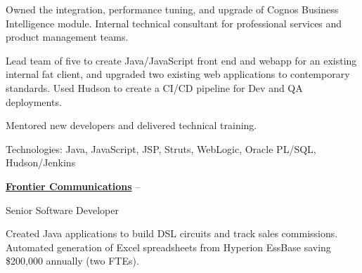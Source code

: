 \documentclass[letterpaper,MMMMyyyy,nonstopmode]{simpleresumecv}
\newcommand{\comment}[1]{\ignorespaces} %
\newif\ifLOCATION
\newif\ifLONG
\begin{document}
\begin{Body}
\begin{Detail}
\BulletItem
Owned the integration, performance tuning, and upgrade of Cognos Business Intelligence module.
\BulletItem
Internal technical consultant for professional services and product management teams.

\end{Detail}

\ifLONG

\BigGap
\Entry
\href{http://www.paychex.com/}
{\textbf{Paychex}}
\hfill 
\DatestampY{2005} -- \DatestampY{2010}

Lead Developer
\ifLOCATION
\hfill
Rochester, New York
\fi

\begin{Detail}
\BulletItem
Lead team of five to create Java/JavaScript front end and webapp for an existing internal fat client, and upgraded two existing web applications to contemporary standards. Used Hudson to create a CI/CD pipeline for Dev and QA deployments.

\BulletItem
Mentored new developers and delivered technical training.
\iffalse
\BulletItem
Member of architecture team to research and set five-year strategy for web application strategy.
\fi

\Gap
Technologies: Java, JavaScript, JSP, Struts, WebLogic, Oracle PL/SQL, Hudson/Jenkins 
\end{Detail}

\BigGap
\Entry
\href{http://www.frontier.com/}
{\textbf{Frontier Communications}}
\hfill 
 -- 

Senior Software Developer
\ifLOCATION
\hfill
Rochester, New York
\fi

\begin{Detail}
\Item
Created Java applications to build DSL circuits and track sales commissions\comment{; CruiseControl used for Continuous Integration}. 
Automated generation of \comment{20} Excel spreadsheets from Hyperion EssBase saving \$200,000 annually (two FTEs).

\end{Detail}


\end{Body}
\end{document}
